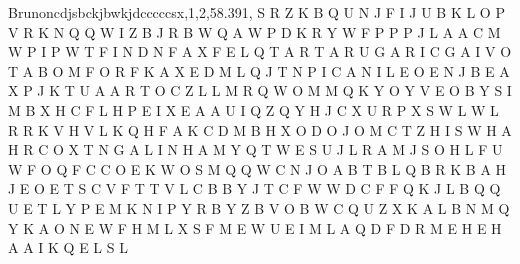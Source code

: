 Brunoncdjsbckjbwkjdcccccsx,1,2,58.391,
  S R Z K B Q U N J F I J U B K L O P V R 
  K N Q Q W I Z B J R B W Q A W P D K R Y 
  W F P P P J L A A C M W P I P W T F I N 
  D N F A X F E L Q T A R T A R U G A R I 
  C G A I V O T A B O M F O R F K A X E D 
  M L Q J T N P I C A N I L E O E N J B E 
  A X P J K T U A A R T O C Z L L M R Q W 
  O M M Q K Y O Y V E O B Y S I M B X H C 
  F L H P E I X E A A U I Q Z Q Y H J C X 
  U R P X S W L W L R R K V H V L K Q H F 
  A K C D M B H X O D O J O M C T Z H I S 
  W H A H R C O X T N G A L I N H A M Y Q 
  T W E S U J L R A M J S O H L F U W F O 
  Q F C C O E K W O S M Q Q W C N J O A B 
  T B L Q B R K B A H J E O E T S C V F T 
  T V L C B B Y J T C F W W D C F F Q K J 
  L B Q Q U E T L Y P E M K N I P Y R B Y 
  Z B V O B W C Q U Z X K A L B N M Q Y K 
  A O N E W F H M L X S F M E W U E I M L 
  A Q D F D R M E H E H A A I K Q E L S L 
